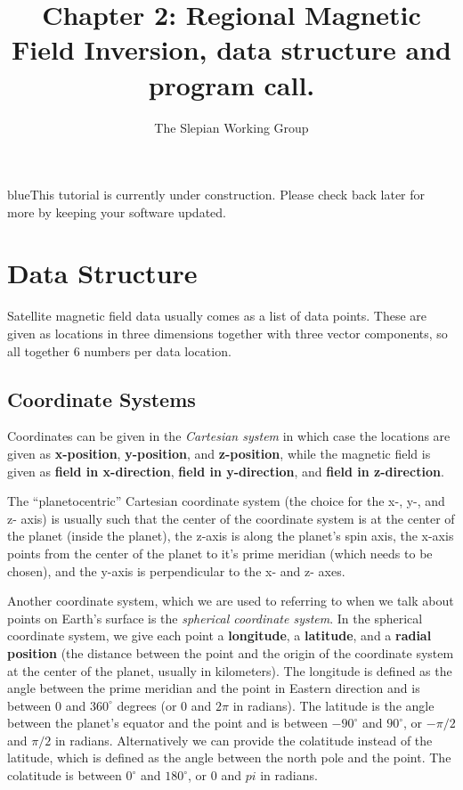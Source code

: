 \documentclass[11pt]{article}
\title{Chapter 2: Regional Magnetic Field Inversion, data structure
  and program call.}
\author{The Slepian Working Group}
\newcommand{\TAG}{\begin{color}{blue}This tutorial is currently under
    construction. Please check back later for more by keeping your
    software updated.\end{color}}
\begin{document}
\maketitle

\TAG

\section{Data Structure}

Satellite magnetic field data usually comes as a list of data
points. These are given as locations in three dimensions together with
three vector components, so all together 6 numbers per data location.

\subsection{Coordinate Systems}

Coordinates can be given in the \emph{Cartesian system} in which case
the locations are given as \textbf{x-position}, \textbf{y-position},
and \textbf{z-position}, while the magnetic field is given as
\textbf{field in x-direction}, \textbf{field in y-direction}, and
\textbf{field in z-direction}.


The ``planetocentric'' Cartesian coordinate system (the choice for the
x-, y-, and z- axis) is usually such that the center of the coordinate
system is at the center of the planet (inside the planet), the z-axis
is along the planet's spin axis, the x-axis points from the center of
the planet to it's prime meridian (which needs to be chosen), and the
y-axis is perpendicular to the x- and z- axes.

Another coordinate system, which we are used to referring to when we
talk about points on Earth's surface is the \emph{spherical coordinate
  system}. In the spherical coordinate system, we give each point a
\textbf{longitude}, a \textbf{latitude}, and a \textbf{radial
  position} (the distance between the point and the origin of the
coordinate system at the center of the planet, usually in
kilometers). The longitude is defined as the angle between the prime
meridian and the point in Eastern direction and is between 0 and
$360^\circ$ degrees (or 0 and $2\pi$ in radians). The latitude is the
angle between the planet's equator and the point and is between
$-90^\circ$ and $90^\circ$, or $-\pi/2$ and $\pi/2$ in
radians. Alternatively we can provide the colatitude instead of the
latitude, which is defined as the angle between the north pole and the
point. The colatitude is between $0^\circ$ and $180^\circ$, or $0$ and
$pi$ in radians.
\end{document}
